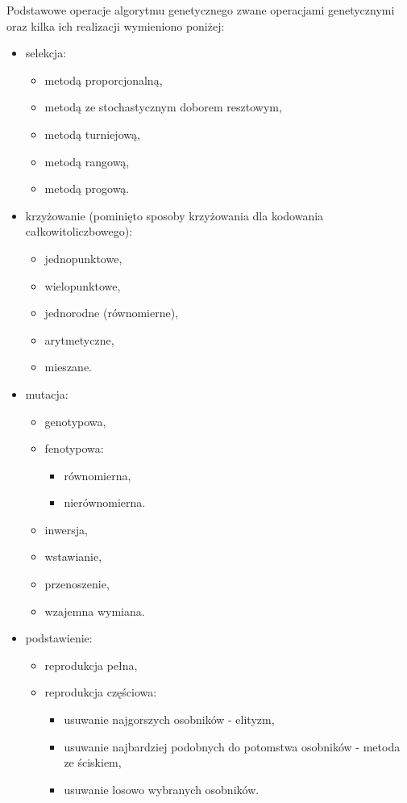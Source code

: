 Podstawowe operacje algorytmu genetycznego zwane operacjami genetycznymi oraz kilka ich realizacji wymieniono poniżej:
\begin{itemize}
	\item selekcja:
	\begin{itemize}
		\item metodą proporcjonalną,
		\item metodą ze stochastycznym doborem resztowym,
		\item metodą turniejową,
		\item metodą rangową,
		\item metodą progową.
	\end{itemize}
	\item krzyżowanie (pominięto sposoby krzyżowania dla kodowania całkowitoliczbowego):
	\begin{itemize}
		\item jednopunktowe,
		\item wielopunktowe,
		\item jednorodne (równomierne),
		\item arytmetyczne,
		\item mieszane.
	\end{itemize}
	\item mutacja:
	\begin{itemize}
		\item genotypowa,
		\item fenotypowa:
		\begin{itemize}
			\item równomierna,
			\item nierównomierna.
		\end{itemize}
		\item inwersja,
		\item wstawianie,
		\item przenoszenie,
		\item wzajemna wymiana.
	\end{itemize}
	\item podstawienie:
	\begin{itemize}
		\item reprodukcja pełna,
		\item reprodukcja częściowa:
		\begin{itemize}
			\item usuwanie najgorszych osobników - elityzm,
			\item usuwanie najbardziej podobnych do potomstwa osobników - metoda ze ściskiem,
			\item usuwanie losowo wybranych osobników. \cite{bialaszewski2012}
		\end{itemize}
	\end{itemize}
\end{itemize} 

